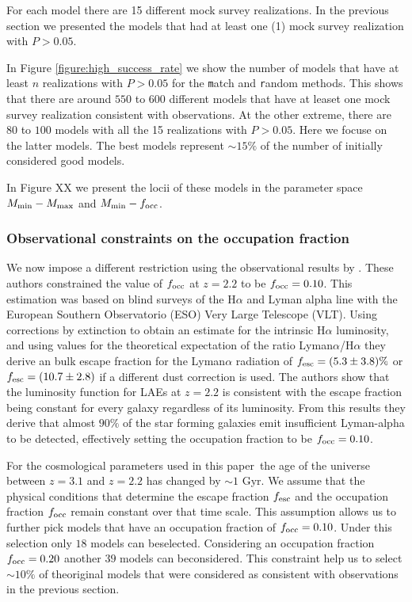 \documentclass[usenatbib]{mn2e}
\newcommand{\documentname}{paper~}
\begin{document}
For each model there are 15 different mock survey realizations. In the
previous section we presented the models that had at least one (1)
mock survey realization with $P>0.05$.

In Figure \ref{figure:high_success_rate} we show the number of models
that have at least $n$ realizations with $P>0.05$ for the {\texttt
  match} and {\texttt random} methods.  This shows that there are
around $550$ to $600$ different models that have at leaset one mock
survey realization consistent with observations. At the other extreme,
there are $80$ to $100$ models with all the 15 realizations with
$P>0.05$. Here we focuse on the latter models. The best models
represent $\sim 15\%$ of the number of initially considered good
models. 

In Figure XX we present the locii of these models in the parameter
space $M_{\rm min}-M_{\rm max}$ and $M_{\rm min}-f_{\rm occ}$.  



\subsubsection{Observational constraints on the occupation fraction}

We now impose a different restriction using the observational results
by \cite{Hayes2010}. These authors constrained the value of $f_{\rm
  occ}$ at $z=2.2$ to be $f_{\rm occ}=0.10$. This estimation was based
on blind surveys of the H$\alpha$ and Lyman alpha line with the European Southern
Observatorio (ESO) Very Large Telescope (VLT). Using corrections by
extinction to obtain an estimate for the intrinsic H$\alpha$
luminosity, and using values for the theoretical expectation of the
ratio Lyman$\alpha$/H$\alpha$ they derive an bulk escape fraction for
the Lyman$\alpha$ radiation of $f_{\rm esc}=(5.3\pm 3.8)\%$ or $f_{\rm
esc}=(10.7\pm 2.8)$ if a different dust correction is used. The
authors show that the luminosity function for LAEs at $z=2.2$ is
consistent with the escape fraction being constant for every galaxy
regardless of its luminosity. From this results they derive that
almost $90\%$ of the star forming galaxies emit insufficient
Lyman-alpha to be detected, effectively setting the occupation
fraction to be $f_{\rm occ}=0.10$.  

For the cosmological parameters used in this \documentname the age of
the universe between $z=3.1$ and $z=2.2$ has changed by $\sim 1$
Gyr. We assume that the physical conditions that determine the escape
fraction $f_{\rm esc}$ and the occupation fraction $f_{\rm  occ}$
remain constant over that time scale. This assumption allows us to
further pick models that have an occupation fraction of $f_{\rm
  occ}=0.10$. Under this selection only $18$ models can
beselected. Considering an occupation fraction $f_{\rm occ}=0.20$
another $39$ models can beconsidered. This constraint help us to
select $\sim 10\%$ of theoriginal models that were considered as
consistent with observations in the previous section. 
\end{document}
